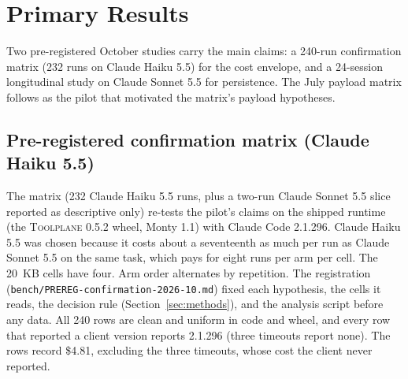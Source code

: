 \documentclass[10pt,twocolumn]{article}
\newcommand{\toolplane}{\textsc{Toolplane}\xspace}
\newcommand{\usd}[1]{\$#1}
\begin{document}
\section{Primary Results}
\label{sec:primary-results}

Two pre-registered October studies carry the main claims: a 240-run
confirmation matrix (232 runs on Claude Haiku 5.5) for the cost envelope, and a 24-session
longitudinal study on Claude Sonnet 5.5 for persistence.  The July payload
matrix follows as the pilot that motivated the matrix's payload hypotheses.

\subsection{Pre-registered confirmation matrix (Claude Haiku 5.5)}
\label{sec:confirm}

The matrix (232 Claude Haiku 5.5 runs, plus a two-run Claude Sonnet 5.5 slice
reported as descriptive only) re-tests the pilot's claims on the shipped runtime (the
\toolplane 0.5.2 wheel, Monty 1.1) with Claude Code 2.1.296.  Claude Haiku 5.5
was chosen because it costs about a seventeenth as much per run as Claude
Sonnet 5.5 on the same task, which pays for eight runs per arm per cell.  The
20~KB cells have four.  Arm order alternates by repetition.  The registration
(\texttt{bench/PREREG-confirmation-2026-10.md}) fixed each hypothesis, the
cells it reads, the decision rule (Section~\ref{sec:methods}), and the
analysis script before any data.  All 240 rows are clean and uniform in code
and wheel, and every row that reported a client version reports 2.1.296 (three
timeouts report none).  The rows record \usd{4.81}, excluding the three
timeouts, whose cost the client never reported.
\end{document}
